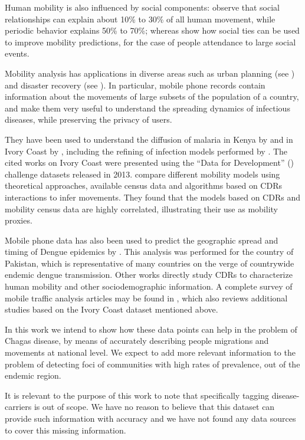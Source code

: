 Human mobility is also influenced by social components: \cite{cho2011friendship} observe that social relationships
can explain about 10\% to 30\% of all human movement, while periodic
behavior explains 50\% to 70\%; whereas \cite{ponieman2016mobility} show how social ties can be used to improve mobility predictions, for the case of people attendance to large social events.

Mobility analysis has applications in diverse areas such as urban planning (see \cite{wang2012understanding}) and disaster recovery (see \cite{lu2012predictability}).
In particular, mobile phone records contain information about the movements of large subsets of the population of a country, and make them very useful to understand the spreading dynamics of infectious diseases, while preserving the privacy of users.

They have been used to understand the diffusion of malaria in Kenya by \cite{wesolowski2012quantifying} and in Ivory Coast by \cite{enns2013human}, including the refining of infection models performed by \cite{chunara2013large}. 
The cited works on Ivory Coast were presented using the ``Data for Development'' (\cite{d4d}) challenge datasets released in 2013. \cite{tizzoni2014use} compare different mobility models using theoretical approaches, available census data and algorithms based on CDRs interactions to infer movements. 
They found that the models based on CDRs and mobility census data are highly correlated, illustrating their use as mobility proxies.

Mobile phone data has also been used to predict the geographic spread and timing of Dengue epidemics by \cite{wesolowski2015impact}. 
This analysis was performed for the country of Pakistan, which is representative of many countries on the verge of countrywide endemic dengue transmission. 
Other works directly study CDRs to characterize human mobility and other sociodemographic information. 
A complete survey of mobile traffic analysis articles may be found in \cite{naboulsi2015mobile}, which also reviews additional studies based on the Ivory Coast dataset mentioned above.

In this work we intend to show how these data points can help in the problem of Chagas disease, by means of accurately describing people migrations and movements at national level.
We expect to add more relevant information to the problem of detecting foci of communities with high rates of prevalence, out of the endemic region.

It is relevant to the purpose of this work to note that specifically tagging disease-carriers is out of scope. 
We have no reason to believe that this dataset can provide such information with accuracy and we have not found any data sources to cover this missing  information.

